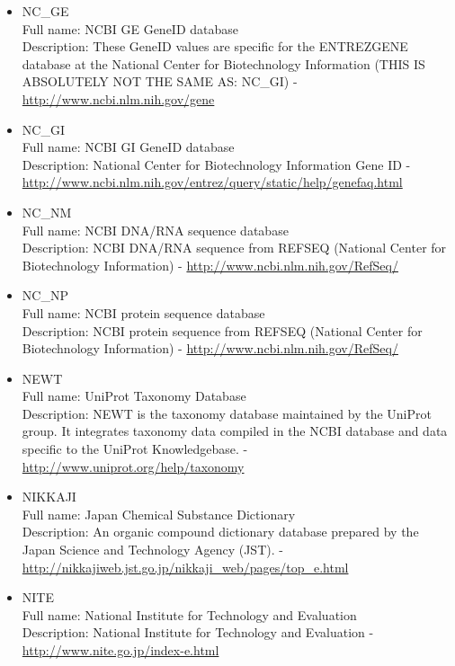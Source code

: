 \begin{itemize}
\item{NC\_GE}\\ Full name: NCBI GE GeneID database\\ Description: These GeneID values are specific for the ENTREZGENE database at the National Center for Biotechnology Information (THIS IS ABSOLUTELY NOT THE SAME AS: NC\_GI) - 
\url{http://www.ncbi.nlm.nih.gov/gene}

\item{NC\_GI}\\ Full name: NCBI GI GeneID database\\ Description: National Center for Biotechnology Information Gene ID - 
\url{http://www.ncbi.nlm.nih.gov/entrez/query/static/help/genefaq.html}

\item{NC\_NM}\\ Full name: NCBI DNA/RNA sequence database\\ Description: NCBI DNA/RNA sequence from REFSEQ (National Center for Biotechnology Information) - 
\url{http://www.ncbi.nlm.nih.gov/RefSeq/}

\item{NC\_NP}\\ Full name: NCBI protein sequence database\\ Description: NCBI protein sequence from REFSEQ (National Center for Biotechnology Information) - 
\url{http://www.ncbi.nlm.nih.gov/RefSeq/}

\item{NEWT}\\ Full name: UniProt Taxonomy Database\\ Description: NEWT is the taxonomy database maintained by the UniProt group. It integrates taxonomy data compiled in the NCBI database and data specific to the UniProt Knowledgebase. - 
\url{http://www.uniprot.org/help/taxonomy}

\item{NIKKAJI}\\ Full name: Japan Chemical Substance Dictionary\\ Description: An organic compound dictionary database prepared by the Japan Science and Technology Agency (JST). - 
\url{http://nikkajiweb.jst.go.jp/nikkaji\_web/pages/top\_e.html}

\item{NITE}\\ Full name: National Institute for Technology and Evaluation\\ Description: National Institute for Technology and Evaluation - 
\url{http://www.nite.go.jp/index-e.html}


\end{itemize}
